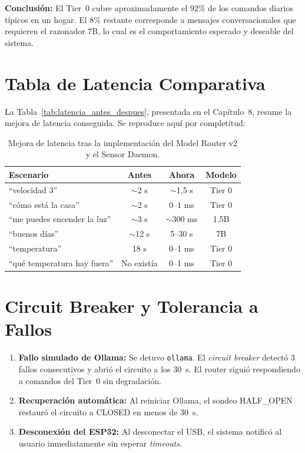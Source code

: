 \textbf{Conclusión:} El Tier~0 cubre aproximadamente el 92\% de los comandos diarios típicos en un hogar. El 8\% restante corresponde a mensajes conversacionales que requieren el razonador 7B, lo cual es el comportamiento esperado y deseable del sistema.

\section{Tabla de Latencia Comparativa}

La Tabla~\ref{tab:latencia_antes_despues}, presentada en el Capítulo~8, resume la mejora de latencia conseguida. Se reproduce aquí por completitud:

\begin{table}[h]
\centering
\begin{tabular}{|l|c|c|c|}
\hline
\textbf{Escenario} & \textbf{Antes} & \textbf{Ahora} & \textbf{Modelo} \\
\hline
``velocidad 3'' & $\sim$2 s & $\sim$1,5 s & Tier 0 \\
``cómo está la casa'' & $\sim$2 s & 0--1 ms & Tier 0 \\
``me puedes encender la luz'' & $\sim$3 s & $\sim$300 ms & 1.5B \\
``buenos días'' & $\sim$12 s & 5--30 s & 7B \\
``temperatura'' & 18 s & 0--1 ms & Tier 0 \\
``qué temperatura hay fuera'' & No existía & 0--1 ms & Tier 0 \\
\hline
\end{tabular}
\caption{Mejora de latencia tras la implementación del Model Router v2 y el Sensor Daemon.}
\end{table}

\section{Circuit Breaker y Tolerancia a Fallos}
\label{sec:pruebas_circuit_breaker}

\begin{enumerate}
    \item \textbf{Fallo simulado de Ollama:} Se detuvo \texttt{ollama}. El \textit{circuit breaker} detectó 3 fallos consecutivos y abrió el circuito a los 30~s. El router siguió respondiendo a comandos del Tier~0 sin degradación.
    \item \textbf{Recuperación automática:} Al reiniciar Ollama, el sondeo HALF\_OPEN restauró el circuito a CLOSED en menos de 30~s.
    \item \textbf{Desconexión del ESP32:} Al desconectar el USB, el sistema notificó al usuario inmediatamente sin esperar \textit{timeouts}.
\end{enumerate}

